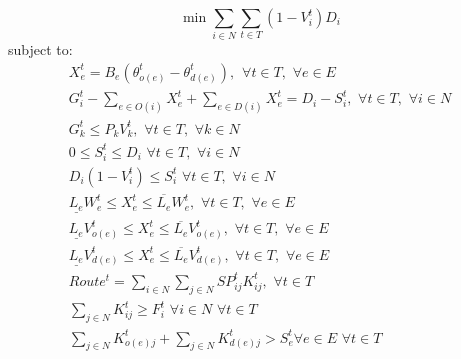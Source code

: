 \documentclass{article}
\begin{document}
		\begin{equation}
	\min \sum_{i \in N} \sum_{t \in T} (1-V_i^t)D_i
	\end{equation}
	subject to:
	\begin{eqnarray}
	X_e^t = B_e (\theta_{o(e)}^t - \theta_{d(e)}^t), \hspace{5pt} \forall t \in T, \hspace{4pt} \forall e \in E\\
	G_i^t - \sum_{e \in O(i)} X_e^t + \sum_{e \in D(i)} X_e^t = D_i-S_i^t, \hspace{4pt} \forall t \in T, \hspace{4pt} \forall i \in N\\
	G_k^t \leq P_{k} V_{k}^t, \hspace{4pt} \forall t \in T, \hspace{4pt} \forall k \in N\\
	0\leq S_i^t \leq D_i \hspace{4pt} \forall t \in T, \hspace{4pt} \forall i \in N\\
	D_i (1-V_i^t) \leq S_i^t \hspace{4pt} \forall t \in T, \hspace{4pt} \forall i \in N\\
	\underline{L_e}W_{e}^t \leq X_{e}^t \leq \overline{L_e}W_{e}^t, \hspace{4pt} \forall t \in T, \hspace{4pt} \forall e \in E\\
	\underline{L_e}V_{o(e)}^t \leq X_{e}^t \leq \overline{L_e}V_{o(e)}^t, \hspace{4pt} \forall t \in T, \hspace{4pt} \forall e \in E\\
	\underline{L_e}V_{d(e)}^t \leq X_{e}^t \leq \overline{L_e}V_{d(e)}^t, \hspace{4pt} \forall t \in T, \hspace{4pt} \forall e \in E\\
	Route^t = \sum_{i \in N} \sum_{j \in N} SP_{ij}^t K_{ij}^{t},  \hspace{4pt} \forall t \in T\\
	\sum_{j \in N} K_{ij}^t \geq F_i^t \hspace{4pt} \forall i \in N \hspace{4pt} \forall t \in T\\
	\sum_{j \in N} K_{o(e)j}^t + \sum_{j \in N} K_{d(e)j}^t > S_e^t \forall e \in E \hspace{4pt} \forall t \in T\\

\end{eqnarray}
\end{document}

